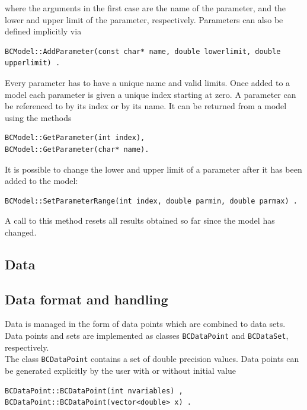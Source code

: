 \documentclass[11pt, a4paper]{article}
\begin{document}
\noindent
where the arguments in the first case are the name of the parameter,
and the lower and upper limit of the parameter,
respectively. Parameters can also be defined implicitly via
%
\begin{verbatim}
BCModel::AddParameter(const char* name, double lowerlimit, double upperlimit) .
\end{verbatim}

\noindent
Every parameter has to have a unique name and valid limits. Once added
to a model each parameter is given a unique index starting at zero. A
parameter can be referenced to by its index or by its name. It can be
returned from a model using the methods
%
\begin{verbatim}
BCModel::GetParameter(int index),
BCModel::GetParameter(char* name).
\end{verbatim}

\noindent
It is possible to change the lower and upper limit of a parameter
after it has been added to the model: 
%
\begin{verbatim}
BCModel::SetParameterRange(int index, double parmin, double parmax) .
\end{verbatim}
%
A call to this method resets all results obtained so far since the
model has changed. 


\subsection{Data}
\label{subsection:data}

\subsection{Data format and handling}
\label{subsection:dataformat}

Data is managed in the form of data points which are combined to data
sets. Data points and sets are implemented as classes
\verb|BCDataPoint| and \verb|BCDataSet|, respectively. \\

\noindent
The class \verb|BCDataPoint| contains a set of double precision
values. Data points can be generated explicitly by the user with or
without initial value
%
\begin{verbatim}
BCDataPoint::BCDataPoint(int nvariables) ,
BCDataPoint::BCDataPoint(vector<double> x) .
\end{verbatim}
\end{document}
